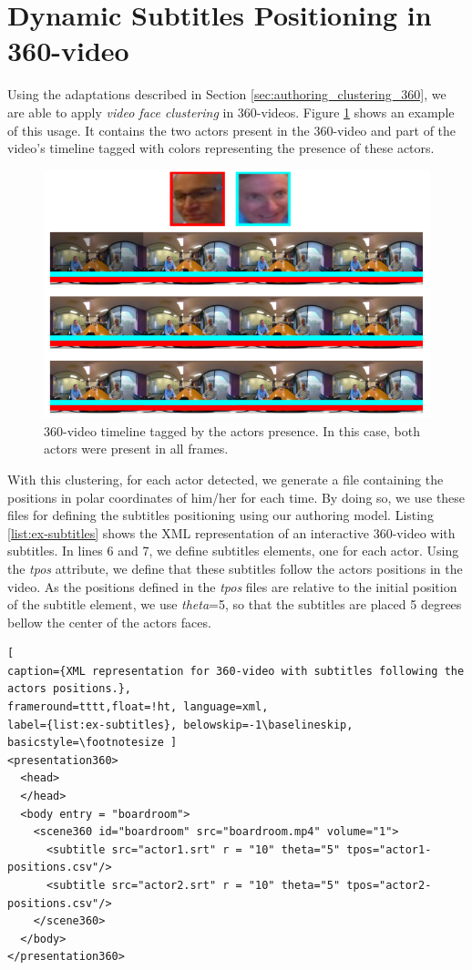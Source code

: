 \section{Dynamic Subtitles Positioning in 360-video}
\label{sec:authoring_discussion}

Using the adaptations described in Section \ref{sec:authoring_clustering_360}, we are able to apply \emph{video face clustering} in 360-videos. Figure \ref{fig:360_video_timeline} shows an example of this usage. It contains the two actors present in the 360-video and part of the video's timeline tagged with colors representing the presence of these actors.

\begin{figure}[!ht]
    \centering
    \includegraphics[width=0.8\linewidth]{img/video360/timeline-360.png}
    \caption{360-video timeline tagged by the actors presence. In this case, both actors were present in all frames.}
    \label{fig:360_video_timeline}
\end{figure}

With this clustering, for each actor detected, we generate a file containing the positions in polar coordinates of him/her for each time. By doing so, we use these files for defining the subtitles positioning using our authoring model. Listing \ref{list:ex-subtitles} shows the XML representation of an interactive 360-video with subtitles. In lines 6 and 7, we define subtitles elements, one for each actor. Using the \emph{tpos} attribute, we define that these subtitles follow the actors positions in the video. As the positions defined in the \emph{tpos} files are relative to the initial position of the subtitle element, we use \emph{theta}=5, so that the subtitles are placed 5 degrees bellow the center of the actors faces.


\begin{lstlisting}[
caption={XML representation for 360-video with subtitles following the actors positions.},
frameround=tttt,float=!ht, language=xml, 
label={list:ex-subtitles}, belowskip=-1\baselineskip, basicstyle=\footnotesize ]
<presentation360>
  <head>
  </head>
  <body entry = "boardroom">
    <scene360 id="boardroom" src="boardroom.mp4" volume="1">   
      <subtitle src="actor1.srt" r = "10" theta="5" tpos="actor1-positions.csv"/>      
      <subtitle src="actor2.srt" r = "10" theta="5" tpos="actor2-positions.csv"/>
    </scene360>
  </body>
</presentation360>
\end{lstlisting}







